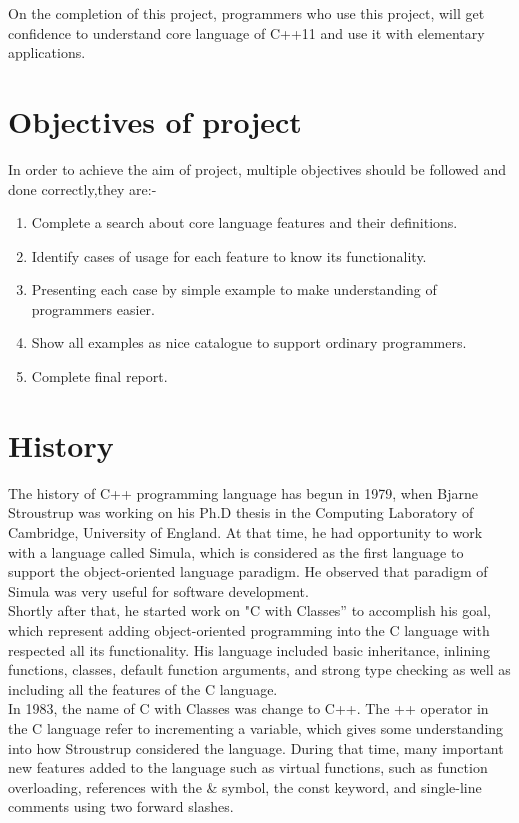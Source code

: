 \documentclass[12pt]{report}
\begin{document}
On the completion of this project, programmers who use this project, will get confidence to understand core language of  C++11 and use it with elementary applications.

\section{Objectives of project}
\label{section:objectives of project}
In order to achieve the aim of project, multiple objectives should be followed and done correctly,they are:-
 \begin{enumerate}
   \item Complete a search about core language features and their definitions.
   \item Identify cases of usage for each feature  to know its functionality.
   \item Presenting each case by simple example to make understanding of \linebreak programmers easier.
   \item Show all examples as nice catalogue to support ordinary \linebreak programmers.
   \item Complete final report.
 \end{enumerate}       
 
  
\section{History}
\label{section: History}
The history of C++ programming language has begun in 1979, when Bjarne Stroustrup was working on his Ph.D thesis in the Computing Laboratory of Cambridge, University of England. At that time, he had opportunity to work with a language called Simula, which is considered as the first language to support the object-oriented language paradigm. He observed that paradigm of Simula was very useful for software development\cite{StroustrupHistory}.\\
Shortly after that, he started work on "C with Classes” to accomplish his goal, which represent adding object-oriented programming into the C language with respected all its functionality. His language included basic inheritance, inlining functions, classes, default function arguments, and strong type checking as well as including all the features of the C language\cite{StroustrupHistory}.\\
In 1983, the name of C with Classes was change to C++. The ++ operator in the C language refer to incrementing a variable, which gives some understanding into how Stroustrup considered the language. During that time, many important new features added to the language such as  virtual functions, such as function overloading, references with the \& symbol, the const keyword, and single-line comments using two forward slashes\cite{StroustrupHistory}.
\end{document}

